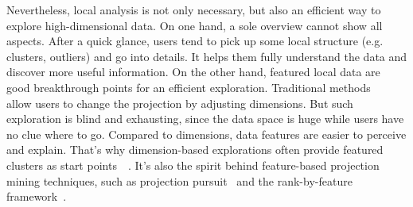 {Nevertheless, local analysis is not only necessary, but also an efficient way to explore high-dimensional data. On one hand, a sole overview cannot show all aspects. After a quick glance, users tend to pick up some local structure (e.g. clusters, outliers) and go into details. It helps them fully understand the data and discover more useful information. On the other hand, featured local data are good breakthrough points for an efficient exploration. Traditional methods~\cite{DBLP:journals/tvcg/NamM13}~\cite{DBLP:journals/tvcg/LehmannT13} allow users to change the projection by adjusting dimensions. But such exploration is blind and exhausting, since the data space is huge while users have no clue where to go. Compared to dimensions, data features are easier to perceive and explain. That's why dimension-based explorations often provide featured clusters as start points~\cite{DBLP:journals/tvcg/NamM13}~\cite{DBLP:journals/cgf/LiuWTBP15}. It's also the spirit behind feature-based projection mining techniques, such as projection pursuit~\cite{DBLP:journals/tc/FriedmanT74} and the rank-by-feature framework~\cite{DBLP:journals/ivs/SeoS05}.
}